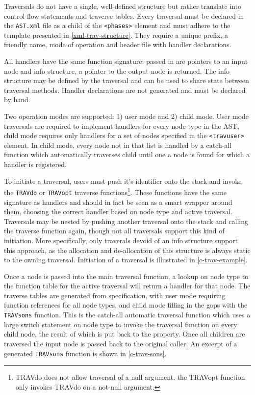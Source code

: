 \documentclass[twoside,openright]{uva-bachelor-thesis}
\newcommand{\code}[1]{\texttt{\footnotesize#1}}
\begin{document}
			Traversals do not have a single, well-defined structure but rather translate into control flow statements and traverse tables. Every traversal must be declared in the \code{AST.xml} file as a child of the \code{<phases>} element and must adhere to the template presented in \cref{xml-trav-structure}. They require a unique prefix, a friendly name, mode of operation and header file with handler declarations.
			
			All handlers have the same function signature: passed in are pointers to an input node and info structure, a pointer to the output node is returned. The info structure may be defined by the traversal and can be used to share state between traversal methods. Handler declarations are not generated and must be declared by hand.
			
			Two operation modes are supported: 1) user mode and 2) child mode. User mode traversals are required to implement handlers for every node type in the AST, child mode requires only handlers for a set of nodes specified in the \code{<travuser>} element. In child mode, every node not in that list is handled by a catch-all function which automatically traverses child until one a node is found for which a handler is registered.
			
			To initiate a traversal, users must push it's identifier onto the stack and invoke the \code{TRAVdo} or \code{TRAVopt} traverse functions\footnote{TRAVdo does not allow traversal of a null argument, the TRAVopt function only invokes TRAVdo on a not-null argument.}. These functions have the same signature as handlers and should in fact be seen as a smart wrapper around them, choosing the correct handler based on node type and active traversal. Traversals may be nested by pushing another traversal onto the stack and calling the traverse function again, though not all traversals support this kind of initiation. More specifically, only traverals devoid of an info structure support this approach, as the allocation and de-allocation of this structure is always static to the owning traversal. Initiation of a traversal is illustrated in \cref{c-trav-example}.
			
			Once a node is passed into the main traversal function, a lookup on node type to the function table for the active traversal will return a handler for that node. The traverse tables are generated from specification, with user mode requiring function references for all node types, and child mode filling in the gaps with the \code{TRAVsons} function. This is the catch-all automatic traversal function which uses a large switch statement on node type to invoke the traversal function on every child node, the result of which is put back to the property. Once all children are traversed the input node is passed back to the original caller. An excerpt of a generated \code{TRAVsons} function is shown in \cref{c-trav-sons}. 
			
\end{document}

